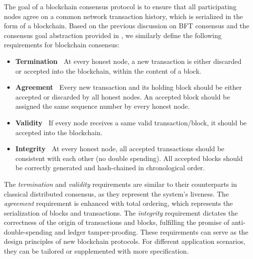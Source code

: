 The goal of a blockchain consensus protocol is to ensure that all participating nodes agree on a common network transaction history, which is serialized in the form of a blockchain. Based on the previous discussion on BFT consensus and the consensus goal abstraction provided in , we similarly define the following requirements for blockchain consensus:
\begin{itemize}
    \item \textbf{Termination~} At every honest node, a new transaction is either discarded or accepted into the blockchain, within the content of a block.
    \item \textbf{Agreement~} Every new transaction and its holding block should be either accepted or discarded by all honest nodes. An accepted block should be assigned the same sequence number by every honest node.
    \item \textbf{Validity~} If every node receives a same valid transaction/block, it should be accepted into the blockchain. 
    \item \textbf{Integrity~} At every honest node, all accepted transactions should be consistent with each other (no double spending). All accepted blocks should be correctly generated and hash-chained in chronological order.
\end{itemize}
The \emph{termination} and \emph{validity} requirements are similar to their counterparts in classical distributed consensus, as they represent the system's liveness. The \emph{agreement} requirement is enhanced with total ordering, which represents the serialization of blocks and transactions. The \emph{integrity} requirement dictates the correctness of the origin of transactions and blocks, fulfilling the promise of anti-double-spending and ledger tamper-proofing.
These requirements can serve as the design principles of new blockchain protocols. For different application scenarios, they can be tailored or supplemented with more specification.

